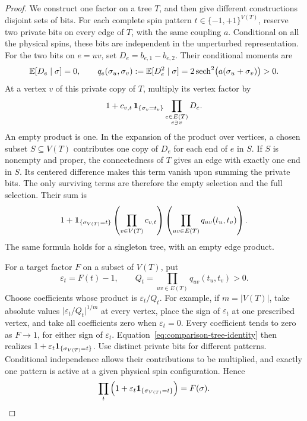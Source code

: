 \begin{proof}
We construct one factor on a tree \(T\), and then give different
constructions disjoint sets of bits.  For each complete spin pattern
\(t\in\{-1,+1\}^{V(T)}\), reserve two private bits on every edge of
\(T\), with the same coupling \(a\).  Conditional on all the physical
spins, these bits are independent in the unperturbed representation.
For the two bits on \(e=uv\), set \(D_e=b_{e,1}-b_{e,2}\).  Their
conditional moments are
\begin{equation}
 \mathbb E[D_e\mid\sigma]=0,\qquad
 q_e(\sigma_u,\sigma_v)
 :=\mathbb E[D_e^2\mid\sigma]
 =2\operatorname{sech}^2\bigl(a(\sigma_u+\sigma_v)\bigr)>0.
 \label{eq:comparison-duplicate-moments}
\end{equation}
At a vertex \(v\) of this private copy of \(T\), multiply its vertex
factor by
\begin{equation}
 1+c_{v,t}\,\mathbf 1_{\{\sigma_v=t_v\}}
       \prod_{\substack{e\in E(T)\\e\ni v}}D_e.
 \label{eq:comparison-tree-correction}
\end{equation}
An empty product is one.  In the expansion of the product over vertices,
a chosen subset \(S\subseteq V(T)\) contributes one copy of \(D_e\) for
each end of \(e\) in \(S\).  If \(S\) is nonempty and proper, the
connectedness of \(T\) gives an edge with exactly one end in \(S\).
Its centered difference makes this term vanish upon summing the private
bits.  The only surviving terms are therefore the empty selection and
the full selection.  Their sum is
\begin{equation}
 1+\mathbf 1_{\{\sigma_{V(T)}=t\}}
       \left(\prod_{v\in V(T)}c_{v,t}\right)
       \left(\prod_{uv\in E(T)}q_{uv}(t_u,t_v)\right).
 \label{eq:comparison-tree-identity}
\end{equation}
The same formula holds for a singleton tree, with an empty edge product.

For a target factor \(F\) on a subset of \(V(T)\), put
\[
 \varepsilon_t=F(t)-1,\qquad
 Q_t=\prod_{uv\in E(T)}q_{uv}(t_u,t_v)>0.
\]
Choose coefficients whose product is \(\varepsilon_t/Q_t\).
For example, if \(m=|V(T)|\), take absolute values
\(\lvert\varepsilon_t/Q_t\rvert^{1/m}\) at every vertex, place the sign
of \(\varepsilon_t\) at one prescribed vertex, and take all coefficients
zero when \(\varepsilon_t=0\).  Every coefficient tends to zero as
\(F\to1\), for either sign of \(\varepsilon_t\).
Equation~\eqref{eq:comparison-tree-identity} then realizes
\(1+\varepsilon_t\mathbf 1_{\{\sigma_{V(T)}=t\}}\).
Use distinct private bits for different patterns.  Conditional
independence allows their contributions to be multiplied, and exactly
one pattern is active at a given physical spin configuration.  Hence
\[
 \prod_t\left(1+\varepsilon_t
                    \mathbf 1_{\{\sigma_{V(T)}=t\}}\right)=F(\sigma).
\]


\end{proof}
